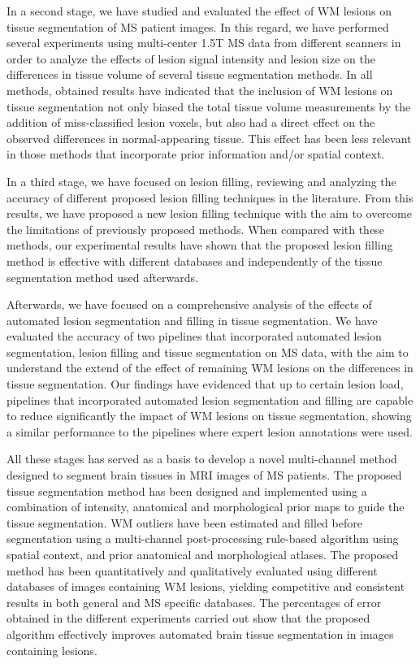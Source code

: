 In a second stage, we have studied and evaluated the effect of WM lesions on tissue segmentation of MS patient images. In this regard, we have performed several experiments using multi-center 1.5T MS data from different scanners in order to analyze the effects of lesion signal intensity and lesion size on the differences in tissue volume of several tissue segmentation methods. In all methods, obtained results have indicated that the inclusion of WM lesions on tissue segmentation not only biased the total tissue volume measurements by the addition of miss-classified lesion voxels, but also had a direct effect on the observed differences in normal-appearing tissue. This effect has been less relevant in those methods that incorporate prior information and/or spatial context. 

In a third stage, we have focused on lesion filling, reviewing and analyzing the accuracy of different proposed lesion filling techniques in the literature. From this results, we have proposed a new lesion filling technique with the aim to overcome the limitations of previously proposed methods. When compared with these methods, our experimental results have shown that the proposed lesion filling method is effective  with different databases and independently of the tissue segmentation method used afterwards. 

Afterwards, we have focused on a comprehensive analysis of the effects of automated lesion segmentation and filling in tissue segmentation. We have evaluated the accuracy of two pipelines that incorporated automated lesion segmentation, lesion filling and tissue segmentation on MS data, with the aim to understand the extend of the effect of remaining WM lesions on the differences in tissue segmentation. Our findings have evidenced that up to certain lesion load, pipelines that incorporated automated lesion segmentation and filling are capable to reduce significantly the impact of WM lesions on tissue segmentation, showing a similar performance to the pipelines where expert lesion annotations were used.

All these stages has served as a basis to develop a novel multi-channel method designed to segment brain tissues in MRI images of MS patients. The proposed tissue segmentation method has been designed and implemented using a combination of intensity, anatomical and morphological prior maps to guide the tissue segmentation. WM outliers have been estimated and filled before segmentation using a multi-channel post-processing rule-based algorithm using spatial context, and prior anatomical and morphological atlases. The proposed method has been quantitatively and qualitatively evaluated using different databases of images containing WM lesions, yielding competitive and consistent results in both general and MS specific databases. The percentages of error obtained in the different experiments carried out show that the proposed algorithm effectively improves automated brain tissue segmentation in images containing lesions. 

